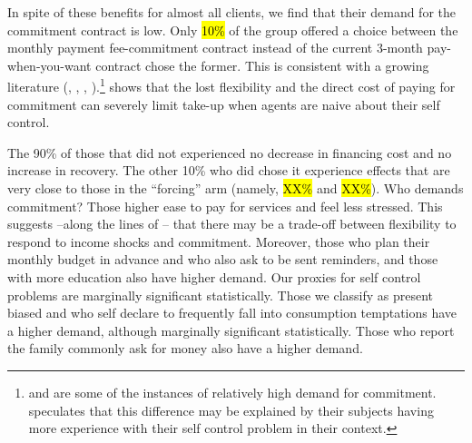 \documentclass[11pt]{article}
\begin{document}
In spite of these benefits for almost all clients, we find that their demand for the commitment contract is low. Only \hl{10\%} of the group offered a choice between the monthly payment fee-commitment contract instead of the current 3-month pay-when-you-want contract chose the former. This is consistent with a growing literature (\cite{Laibson2015}, \cite{Laibson2018}, \cite{John}, \cite{Ted}).\footnote{\cite{Alcohol} and \cite{Kremer} are some of the instances of relatively high demand for commitment. \cite{Alcohol} speculates that this difference may be explained by their subjects having more experience with their self control problem in their context.}  \cite{Laibson2015} shows that the lost flexibility and the direct cost of paying for commitment can severely limit take-up when agents are naive about their self control.

The 90\% of those that did not experienced no decrease in financing cost and no increase in recovery. The other 10\% who did chose it experience effects that are very close to those in the ``forcing'' arm (namely, \hl{XX\%} and \hl{XX\%}). Who demands commitment? Those higher ease to pay for services and feel less stressed. This suggests --along the lines of \cite{John}-- that there may be a trade-off between flexibility to respond to income shocks and commitment. Moreover, those who plan their monthly budget in advance and who also ask to be sent reminders, and those with more education also have higher demand. %
Our proxies for self control problems are marginally significant statistically. Those we classify as present biased and who self declare to frequently fall into consumption temptations have a  higher demand, although marginally significant statistically. Those who report the family commonly ask for money also have a higher demand.


\end{document}
